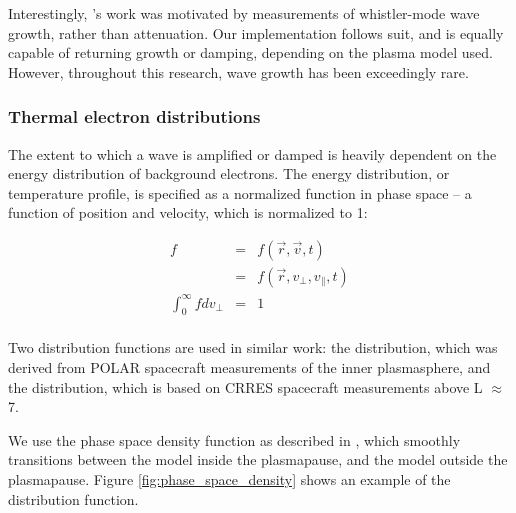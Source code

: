 Interestingly, \citeauthor{Brinca1972}'s work was motivated by measurements of whistler-mode wave growth, rather than attenuation. Our implementation follows suit, and is equally capable of returning growth or damping, depending on the plasma model used. However, throughout this research, wave growth has been exceedingly rare.

\subsubsection{Thermal electron distributions}
\label{section:thermal_electron_distributions}
The extent to which a wave is amplified or damped is heavily dependent on the energy distribution of background electrons. The energy distribution, or temperature profile, is specified as a normalized function in phase space -- a function of position and velocity, which is normalized to 1:

\begin{eqnarray}
f  & = & f(\vec{r}, \vec{v}, t) \\
& =  & f(\vec{r}, v_\perp, v_\parallel, t) \\
\int_0^\infty f d v_\perp & = & 1 \\
\end{eqnarray}

Two distribution functions are used in similar work: the \cite{Bell2002} distribution, which was derived from POLAR spacecraft measurements of the inner plasmasphere, and the \cite{Bortnik2007} distribution, which is based on CRRES spacecraft measurements above L $\approx$ 7.

We use the phase space density function as described in \cite{Golden2010}, which smoothly transitions between the \cite{Bell2002} model inside the plasmapause, and the \cite{Bortnik2007} model outside the plasmapause. Figure \ref{fig:phase_space_density} shows an example of the distribution function.

